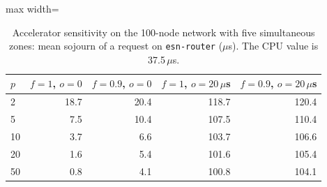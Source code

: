 \begin{table}[htbp]
\centering
\caption{Accelerator sensitivity on the 100-node network with five simultaneous zones: mean sojourn of a request on \texttt{esn-router} ($\mu$s). The CPU value is 37.5\,$\mu$s.}
\label{tab:fpga}
\begin{adjustbox}{max width=\textwidth}
\begin{tabular}{lrrrr}
\toprule
$p$ & $f=1$, $o=0$ & $f=0.9$, $o=0$ & $f=1$, $o=20\,\mu$s & $f=0.9$, $o=20\,\mu$s \\
\midrule
2 & 18.7 & 20.4 & 118.7 & 120.4 \\
5 & 7.5 & 10.4 & 107.5 & 110.4 \\
10 & 3.7 & 6.6 & 103.7 & 106.6 \\
20 & 1.6 & 5.4 & 101.6 & 105.4 \\
50 & 0.8 & 4.1 & 100.8 & 104.1 \\
\bottomrule
\end{tabular}
\end{adjustbox}
\end{table}
